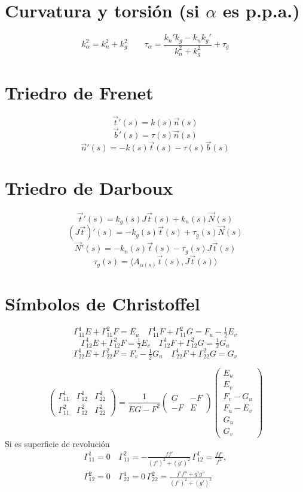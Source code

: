 \documentclass[8pt]{article}
\begin{document}
\begin{multicols}{3}
\section*{Curvatura y torsión (si $\alpha$ es p.p.a.)}
\[
k_\alpha^2 = k_n^2 + k_g^2
\qquad
\tau_\alpha =
\frac{k_n' k_g - k_n k_g'}{k_n^2 + k_g^2} + \tau_g
\]

\section*{Triedro de Frenet}
\[
\vec{t}'(s) = k(s) \vec{n}(s)
\]
\[
\vec{b}'(s) = \tau(s) \vec{n}(s)
\]
\[
\vec{n}'(s) = -k(s)\vec{t}(s) - \tau(s)\vec{b}(s)
\]

\section*{Triedro de Darboux}
\[
\vec{t}'(s) = k_g(s) J\vec{t}(s) + k_n(s)\vec{N}(s)
\]
\[
(J\vec{t})'(s) = -k_g(s)\vec{t}(s) + \tau_g(s)\vec{N}(s)
\]
\[
\vec{N}'(s) = -k_n(s)\vec{t}(s) - \tau_g(s) J\vec{t}(s)
\]
\[
\tau_g(s) = \langle A_{\alpha(s)} \vec{t}(s), J\vec{t}(s) \rangle
\]

\section*{Símbolos de Christoffel}
\[
\Gamma^1_{11} E + \Gamma^2_{11} F = E_u
\quad
\Gamma^1_{11} F + \Gamma^2_{11} G = F_u - \tfrac{1}{2} E_v
\]
\[
\Gamma^1_{12} E + \Gamma^2_{12} F = \tfrac{1}{2} E_v
\quad
\Gamma^1_{12} F + \Gamma^2_{12} G = \tfrac{1}{2} G_u
\]
\[
\Gamma^1_{22} E + \Gamma^2_{22} F = F_v - \tfrac{1}{2} G_u
\quad
\Gamma^1_{22} F + \Gamma^2_{22} G = G_v
\]

\[
\begin{pmatrix}
\Gamma^1_{11} & \Gamma^1_{12} & \Gamma^1_{22} \\
\Gamma^2_{11} & \Gamma^2_{12} & \Gamma^2_{22}
\end{pmatrix}
=
\frac{1}{EG - F^2}
\begin{pmatrix}
G & -F \\
-F & E
\end{pmatrix}
\begin{pmatrix}
E_u \\ E_v \\ F_v - G_u \\
F_u - E_v \\ G_u \\ G_v
\end{pmatrix}
\]
Si es superficie de revolución
\begin{align*}
  \Gamma^{1}_{11}=0 \,& \Gamma^{2}_{11}=-\frac{ff'}{(f')^2+(g')^{2}} \, \Gamma^{1}_{12}=\frac{ff'}{f^2},\\
  \Gamma^{2}_{12}=0 \,& \Gamma^{1}_{22}=0 \, \Gamma_{22}^{2}=\frac{f'f''+g'g''}{(f')^{2}+(g')^2}
\end{align*}



\end{multicols}
\end{document}
